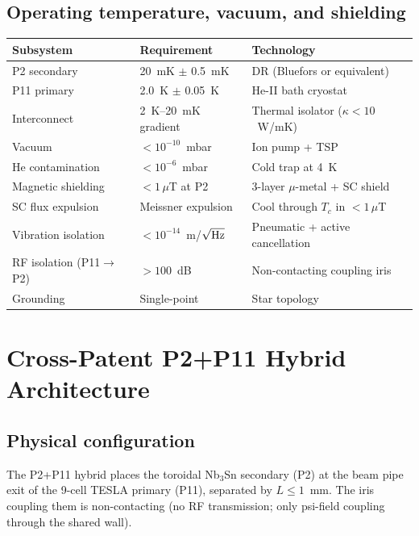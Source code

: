 \documentclass[11pt,twocolumn]{article}
\theoremstyle{definition}
\theoremstyle{remark}
\begin{document}
\subsection{Operating temperature, vacuum, and shielding}
\label{sec:environment}

\begin{center}
\begin{tabular}{@{}lll@{}}
\toprule
Subsystem & Requirement & Technology \\
\midrule
P2 secondary & 20~mK $\pm$ 0.5~mK & DR (Bluefors or equivalent) \\
P11 primary & 2.0~K $\pm$ 0.05~K & He-II bath cryostat \\
Interconnect & 2~K--20~mK gradient & Thermal isolator ($\kappa < 10$~W/mK) \\
\midrule
Vacuum & $< 10^{-10}$~mbar & Ion pump + TSP \\
He contamination & $< 10^{-6}$~mbar & Cold trap at 4~K \\
\midrule
Magnetic shielding & $< 1\,\mu$T at P2 & 3-layer $\mu$-metal + SC shield \\
SC flux expulsion & Meissner expulsion & Cool through $T_c$ in $< 1\,\mu$T \\
Vibration isolation & $< 10^{-14}$~m/$\sqrt{\rm Hz}$ & Pneumatic + active cancellation \\
RF isolation (P11$\to$P2) & $> 100$~dB & Non-contacting coupling iris \\
Grounding & Single-point & Star topology \\
\bottomrule
\end{tabular}
\end{center}

\section{Cross-Patent P2+P11 Hybrid Architecture}
\label{sec:hybrid_architecture}

\subsection{Physical configuration}
\label{sec:physical_config}

The P2+P11 hybrid places the toroidal Nb$_3$Sn secondary (P2)
at the beam pipe exit of the 9-cell TESLA primary (P11), separated by
$L \leq 1$~mm. The iris coupling them is non-contacting (no RF transmission;
only psi-field coupling through the shared wall).
\end{document}
